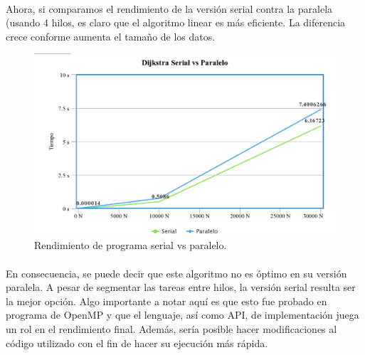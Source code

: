 \documentclass[11pt]{article}
\begin{document}
\paragraph{}
Ahora, si comparamos el rendimiento de la versión serial contra la paralela (usando 4 hilos, es claro que el algoritmo linear es más eficiente. La diferencia crece conforme aumenta el tamaño de los datos. 

\begin{figure}[!h]
\centering
\includegraphics[width=0.9\linewidth]{svp.png}
  \caption{Rendimiento de programa serial vs paralelo.}
\end{figure}

\paragraph{}
En consecuencia, se puede decir que este algoritmo no es óptimo en su versión paralela. A pesar de segmentar las tareas entre hilos, la versión serial resulta ser la mejor opción. Algo importante a notar aquí es que esto fue probado en programa de OpenMP y que el lenguaje, así como API, de implementación juega un rol en el rendimiento final. Además, sería posible hacer modificaciones al código utilizado con el fin de hacer su ejecución más rápida.
\end{document}

